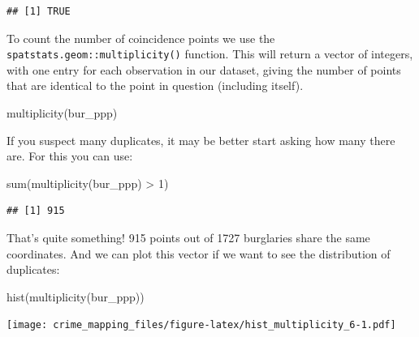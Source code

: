 \documentclass[
  krantz2]{krantz}
\makeatletter
\newenvironment{Shaded}{\begin{snugshade}}{\end{snugshade}}
\newcommand{\DecValTok}[1]{\textcolor[rgb]{0.06,0.06,0.06}{#1}}
\newcommand{\FunctionTok}[1]{\textcolor[rgb]{0,0,0}{#1}}
\newcommand{\NormalTok}[1]{#1}
\newcommand{\SpecialCharTok}[1]{\textcolor[rgb]{0,0,0}{#1}}
\newenvironment{kframe}{%
\medskip{}
\setlength{\fboxsep}{.8em}
 \def\at@end@of@kframe{}%
 \ifinner\ifhmode%
  \def\at@end@of@kframe{\end{minipage}}%
  \begin{minipage}{\columnwidth}%
 \fi\fi%
 \def\FrameCommand##1{\hskip\@totalleftmargin \hskip-\fboxsep
 \colorbox{shadecolor}{##1}\hskip-\fboxsep
     \hskip-\linewidth \hskip-\@totalleftmargin \hskip\columnwidth}%
 \MakeFramed {\advance\hsize-\width
   \@totalleftmargin\z@ \linewidth\hsize
   \@setminipage}}%
 {\par\unskip\endMakeFramed%
 \at@end@of@kframe}
\renewenvironment{Shaded}{\begin{kframe}}{\end{kframe}}
\makeatother
\begin{document}
\begin{verbatim}
## [1] TRUE
\end{verbatim}

To count the number of coincidence points we use the \texttt{spatstats.geom::multiplicity()} function. This will return a vector of integers, with one entry for each observation in our dataset, giving the number of points that are identical to the point in question (including itself).

\begin{Shaded}
\begin{Highlighting}[]
\FunctionTok{multiplicity}\NormalTok{(bur\_ppp)}
\end{Highlighting}
\end{Shaded}

If you suspect many duplicates, it may be better start asking how many there are. For this you can use:

\begin{Shaded}
\begin{Highlighting}[]
\FunctionTok{sum}\NormalTok{(}\FunctionTok{multiplicity}\NormalTok{(bur\_ppp) }\SpecialCharTok{\textgreater{}} \DecValTok{1}\NormalTok{)}
\end{Highlighting}
\end{Shaded}

\begin{verbatim}
## [1] 915
\end{verbatim}

That's quite something! 915 points out of 1727 burglaries share the same coordinates. And we can plot this vector if we want to see the distribution of duplicates:

\begin{Shaded}
\begin{Highlighting}[]
\FunctionTok{hist}\NormalTok{(}\FunctionTok{multiplicity}\NormalTok{(bur\_ppp))}
\end{Highlighting}
\end{Shaded}

\texttt{[image: crime\_mapping\_files/figure-latex/hist\_multiplicity\_6-1.pdf]}
\end{document}
